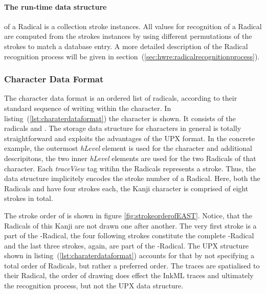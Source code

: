 \paragraph{The run-time data structure} of a Radical is a collection stroke instances.
All values for recognition of a Radical are computed from the strokes instances
by using different permutations of the strokes to match a database entry. A more
detailed description of the Radical recognition process will be given in
section~(\ref{sec:hwre:radicalrecognitionprocess}).

\subsubsection{Character Data Format}
\label{sec:hwre:characterdataformat}

The character data format is an ordered list of radicals, according to their
standard sequence of writing within the character. In 
listing~(\ref{lst:charaterdataformat}) the character  is shown.
It consists of the radicals  and . The storage data structure 
for characters in general is totally straightforward and exploits the 
advantages of the UPX format.
In the concrete example, the outermost \emph{hLevel} element is used for the 
character and additional descripitons, the two inner \emph{hLevel} elements are 
used for the two Radicals of that character. Each \emph{traceView} tag witihn 
the Radicals represents a stroke. Thus, the data structure implicitely encodes
the stroke number of a Radical. Here, both the Radicals  and 
have four strokes each, the Kanji character  is comprised of 
eight strokes in total.

The stroke order of  is shown in figure \ref{fig:strokeorderofEAST}.
Notice, that the Radicals of this Kanji are not drawn one after another.
The very first stroke is a part of the -Radical, the four following
strokes constitute the complete -Radical and the last three strokes,
again, are part of the -Radical.
The UPX structure shown in listing~(\ref{lst:charaterdataformat}) accounts for
that by not specifying a total order of Radicals, but rather a preferred order.
The traces are spatialised to their Radical, the order of drawing does effect
the InkML traces and ultimately the recognition process, 
but not the UPX data structure.

